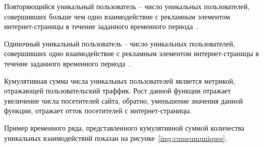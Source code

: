 Повторяющийся уникальный пользователь -- число уникальных пользователей, совершивших больше чем одно взаимодействие
с рекламным элементом интернет-страницы в течение заданного временного периода~\autocite{online:metrics}.

Одиночный уникальный пользователь -- число уникальных пользователей, совершивших одно взаимодействие
с рекламным элементом интернет-страницы в течение заданного временного периода~\autocite{online:metrics}.

Кумулятивная сумма числа уникальных пользователей является метрикой, отражающей  пользовательский траффик. Рост данной
функции отражает увеличение числа посетителей сайта, обратно, уменьшение значения данной функции, отражает отток 
посетителей с интернет-страницы.

Пример временного ряда, представленного кумулятивной суммой количества уникальных взаимодействий показан на 
рисунке~\ref{img:cumsumuniques}.
